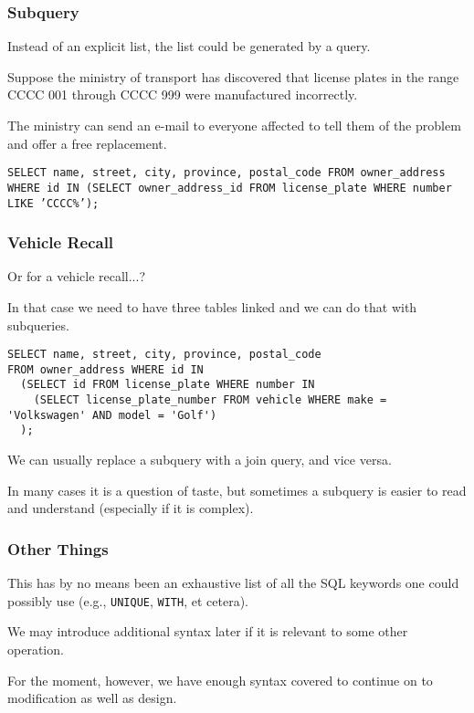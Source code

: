 \begin{frame}
\frametitle{Subquery}

Instead of an explicit list, the list could be generated by a query. 

Suppose the ministry of transport has discovered that license plates in the range CCCC 001 through CCCC 999 were manufactured incorrectly.

The ministry can send an e-mail to everyone affected to tell them of the problem and offer a free replacement. 

\texttt{SELECT name, street, city, province, postal\_code FROM owner\_address WHERE id IN (SELECT owner\_address\_id FROM license\_plate WHERE number LIKE 'CCCC\%');}



\end{frame}



\begin{frame}[fragile]
\frametitle{Vehicle Recall}
Or for a vehicle recall...?

In that case we need to have three tables linked and we can do that with subqueries.
{\scriptsize
\begin{verbatim}
SELECT name, street, city, province, postal_code 
FROM owner_address WHERE id IN 
  (SELECT id FROM license_plate WHERE number IN 
    (SELECT license_plate_number FROM vehicle WHERE make = 'Volkswagen' AND model = 'Golf')
  );
\end{verbatim}
}

We can usually replace a subquery with a join query, and vice versa.

 In many cases it is a question of taste, but sometimes a subquery is easier to read and understand (especially if it is complex). 


\end{frame}



\begin{frame}
\frametitle{Other Things}

This has by no means been an exhaustive list of all the SQL keywords one could possibly use (e.g., \texttt{UNIQUE}, \texttt{WITH}, et cetera). 

We may introduce additional syntax later if it is relevant to some other operation. 

For the moment, however, we have enough syntax covered to continue on to modification as well as design. 


\end{frame}


